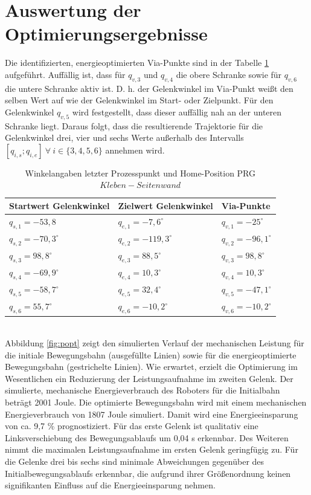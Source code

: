 \section{Auswertung der Optimierungsergebnisse}
Die identifizierten, energieoptimierten Via-Punkte sind in der Tabelle \ref{tab:optviapunkte} aufgeführt. Auffällig ist, dass für $q_{v,3}$ und $q_{v,4}$ die obere Schranke sowie für $q_{v,6}$ die untere Schranke  aktiv ist. D. h. der Gelenkwinkel im Via-Punkt weißt den selben Wert auf wie der Gelenkwinkel im Start- oder Zielpunkt. Für den Gelenkwinkel $q_{v,5}$ wird festgestellt, dass dieser auffällig nah an der unteren Schranke liegt. Daraus folgt, dass die resultierende Trajektorie für die Gelenkwinkel drei, vier und sechs Werte außerhalb des Intervalls $[q_{i,s};q_{i,e}] ~\forall~ i \in \{3,4,5,6\}$ annehmen wird. 
\\
\begin{table}[tbph]
	\centering
	\caption{Winkelangaben letzter Prozesspunkt und Home-Position PRG $Kleben-Seitenwand$}
	\label{tab:optviapunkte}
	\begin{tabular}{|l|l|l|}
		\hline
		Startwert Gelenkwinkel&  Zielwert Gelenkwinkel&  Via-Punkte\\
		\hline
		$q_{s,1} = -53,8$			&  $q_{e,1} = -7,6^{\circ}$  		&$q_{v,1} = -25^{\circ}$  \\
		\hline
		$q_{s,2} = -70,3^{\circ}$	&  $q_{e,2} = -119,3^{\circ}$    	&$q_{v,2} = -96,1^{\circ}$  \\
		\hline
		$q_{s,3} = 98,8^{\circ}$	&  $q_{e,3} = 88,5^{\circ}$ 		&$q_{v,3} = 98,8^{\circ}$  \\
		\hline
		$q_{s,4} = -69,9^{\circ}$	&  $q_{e,4} = 10,3^{\circ}$ 		&$q_{v,4} = 10,3^{\circ}$  \\
		\hline
		$q_{s,5} = -58,7^{\circ}$	&  $q_{e,5} = 32,4^{\circ}$  		&$q_{v,5} = -47,1^{\circ}$  \\
		\hline
		$q_{s,6} = 55,7^{\circ}$	&  $q_{e,6} = -10,2^{\circ}$ 		&$q_{v,6} = -10,2^{\circ}$  \\
		\hline
	\end{tabular}
\end{table}
\\
Abbildung \ref{fig:popt} zeigt den simulierten Verlauf der mechanischen Leistung für die initiale Bewegungsbahn (ausgefüllte Linien) sowie für die energieoptimierte Bewegungsbahn (gestrichelte Linien). Wie erwartet, erzielt die Optimierung im Wesentlichen ein Reduzierung der Leistungsaufnahme im zweiten Gelenk. Der simulierte, mechanische Energieverbrauch des Roboters für die Initialbahn beträgt 2001 Joule. Die optimierte Bewegungsbahn wird mit einem mechanischen Energieverbrauch von 1807 Joule simuliert. Damit wird eine Energieeinsparung von ca. 9,7 \% prognostiziert. Für das erste Gelenk ist qualitativ eine Linksverschiebung des Bewegungsablaufs um 0,04 s erkennbar. Des Weiteren nimmt die maximalen Leistungsaufnahme im ersten Gelenk geringfügig zu. Für die Gelenke drei bis sechs sind minimale Abweichungen gegenüber des Initialbewegungsablaufs erkennbar, die aufgrund ihrer Größenordnung keinen signifikanten Einfluss auf die Energieeinsparung nehmen. 
